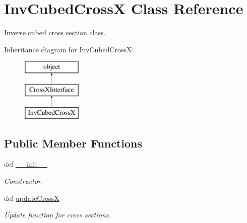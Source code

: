 \hypertarget{classsrc_1_1_cross_x_interface_1_1_inv_cubed_cross_x}{\section{Inv\-Cubed\-Cross\-X Class Reference}
\label{classsrc_1_1_cross_x_interface_1_1_inv_cubed_cross_x}
}


Inverse cubed cross section class.  


Inheritance diagram for Inv\-Cubed\-Cross\-X\-:\begin{figure}[H]
\begin{center}
\leavevmode
\includegraphics[height=3.000000cm]{classsrc_1_1_cross_x_interface_1_1_inv_cubed_cross_x}
\end{center}
\end{figure}
\subsection*{Public Member Functions}
\begin{DoxyCompactItemize}
\item 
def \hyperlink{classsrc_1_1_cross_x_interface_1_1_inv_cubed_cross_x_ac775ee34451fdfa742b318538164070e}{\-\_\-\-\_\-init\-\_\-\-\_\-}
\begin{DoxyCompactList}\small\item\em Constructor. \end{DoxyCompactList}\item 
def \hyperlink{classsrc_1_1_cross_x_interface_1_1_inv_cubed_cross_x_a738b60650d40ca81094acdae3cc55657}{update\-Cross\-X}
\begin{DoxyCompactList}\small\item\em Update function for cross sections. \end{DoxyCompactList}\end{DoxyCompactItemize}
